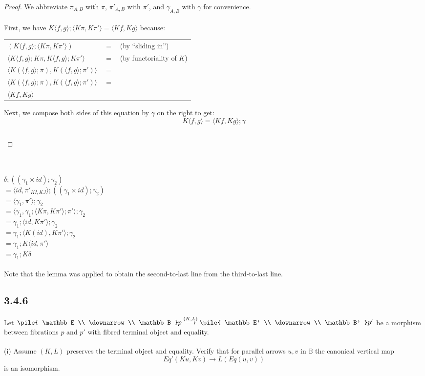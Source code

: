 \documentclass{article}
\newcommand{\vrt}[2]{
\pile{
#1 \\
\downarrow \\
#2
}
}
\begin{document}
\begin{proof}
We abbreviate $\pi_{A,B}$ with $\pi$, $\pi'_{A,B}$ with $\pi'$, and $\gamma_{A,B}$ with $\gamma$ for convenience.\\~\\
First, we have $K\langle f,g \rangle;\langle K\pi, K\pi' \rangle = \langle Kf, Kg \rangle$ because:
\begin{center}
\begin{tabular}{lll}
$(K\langle f,g \rangle;\langle K\pi, K\pi' \rangle)$ & $=$ & (by ``sliding in'') \\
$\langle K \langle f,g \rangle;K\pi, K\langle f,g \rangle;K\pi' \rangle$ & $=$ & (by functoriality of $K$) \\
$\langle K(\langle f,g \rangle;\pi), K(\langle f,g \rangle;\pi') \rangle$ & $=$ & \\
$\langle K(\langle f,g \rangle;\pi), K(\langle f,g \rangle;\pi') \rangle$ & $=$ & \\
$\langle Kf, Kg \rangle$ & &
\end{tabular}
\end{center}
Next, we compose both sides of this equation by $\gamma$ on the right to get:
$$K\langle f,g \rangle = \langle Kf, Kg \rangle;\gamma$$
\begin{tabular}{ll}
\end{tabular}
\end{proof}~\\~\\
$\delta;((\gamma_1 \times id);\gamma_2)$\\
$= \langle id, \pi'_{KI,KJ} \rangle;((\gamma_1 \times id);\gamma_2)$\\
$= \langle \gamma_1, \pi' \rangle;\gamma_2$\\
$= \langle \gamma_1, \gamma_1;\langle K \pi, K \pi' \rangle;\pi' \rangle;\gamma_2$\\
$= \gamma_1;\langle id, K \pi' \rangle;\gamma_2$\\
$= \gamma_1;\langle K(id), K\pi' \rangle;\gamma_2$\\
$= \gamma_1;K\langle id, \pi' \rangle$\\
$= \gamma_1;K\delta$\\~\\
Note that the lemma was applied to obtain the second-to-last line from the third-to-last line.

 
\subsection*{3.4.6}

Let $\vrt{\mathbb E}{\mathbb B}p \overset{(K,L)}{\longrightarrow} \vrt{\mathbb E'}{\mathbb B'}p'$ be a morphism between
fibrations $p$ and $p'$ with fibred terminal object and equality.\\~\\
(i) Assume $(K,L)$ preserves the terminal object and equality. Verify that for parallel arrows $u,v$ in $\mathbb B$
the canonical vertical map 
$$Eq'(Ku,Kv) \longrightarrow L(Eq(u,v))$$
is an isomorphism.

 
\end{document}
